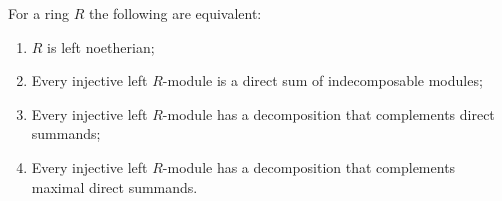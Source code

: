 For a ring $R$ the following are equivalent:

\begin{enumerate}
\item[(a)] $R$ is left noetherian;
\item[(b)] Every injective left $R$-module is a direct sum of indecomposable modules;
\item[(c)] Every injective left $R$-module has a decomposition that complements direct summands;
\item[(d)] Every injective left $R$-module has a decomposition that complements maximal direct summands.
\end{enumerate}
